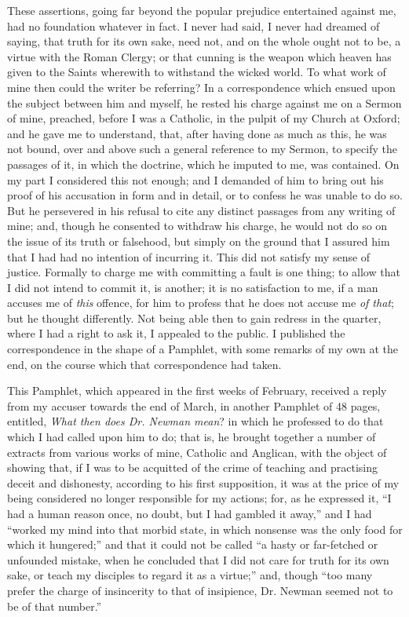 These assertions, going far beyond the popular
prejudice entertained against me, had no foundation whatever in fact.
I never had said, I never had dreamed of saying, that truth for its
own sake, need not, and on the whole ought not to be, a virtue with
the Roman Clergy; or that cunning is the weapon which heaven has given
to the Saints wherewith to withstand the wicked world. To what work of
mine then could the writer be referring? In a correspondence which
ensued upon the subject between him and myself, he rested his charge
against me on a Sermon of mine, preached, before I was a Catholic, in
the pulpit of my Church at Oxford; and he gave me to understand, that,
after having done as much as this, he was not bound, over and above
such a general reference to my Sermon, to specify the passages of it,
in which the doctrine, which he imputed to me, was contained. On my
part I considered this not enough; and I demanded of him to bring out
his proof of his accusation in form and in detail, or to confess
he was unable to do so. But he persevered in his refusal to cite any
distinct passages from any writing of mine; and, though he consented
to withdraw his charge, he would not do so on the issue of its truth
or falsehood, but simply on the ground that I assured him that I had
had no intention of incurring it. This did not satisfy my sense of
justice. Formally to charge me with committing a fault is one thing;
to allow that I did not intend to commit it, is another; it is no
satisfaction to me, if a man accuses me of \emph{this} offence, for
him to profess that he does not accuse me \emph{of that}; but he
thought differently. Not being able then to gain redress in the
quarter, where I had a right to ask it, I appealed to the public. I
published the correspondence in the shape of a Pamphlet, with some
remarks of my own at the end, on the course which that correspondence
had taken.


This Pamphlet, which appeared in the first weeks
of February, received a reply from my accuser towards the end of
March, in another Pamphlet of 48 pages, entitled, \emph{What then does
Dr. Newman mean}? in which he professed to do that which I had
called upon him to do; that is, he brought together a number of
extracts from various works of mine, Catholic and Anglican, with the
object of showing that, if I was to be acquitted of the crime of
teaching and practising deceit and dishonesty, according to his
first supposition, it was at the price of my being considered no
longer responsible for my actions; for, as he expressed it, ``I had a
human reason once, no doubt, but I had gambled it away,'' and I had ``worked
my mind into that morbid state, in which nonsense was the only food
for which it hungered;'' and that it could not be called ``a hasty or
far-fetched or unfounded mistake, when he concluded that I did not
care for truth for its own sake, or teach my disciples to regard it as
a virtue;'' and, though ``too many prefer the charge of insincerity to
that of insipience, Dr. Newman seemed not to be of that number.''


